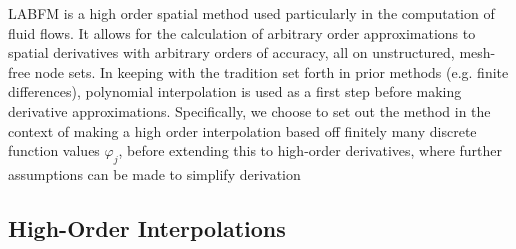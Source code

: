 LABFM \cite{king2024MeshFreeFrameworkHighOrder, king2020HighOrderDifference, king2024MeshFreeFrameworkHighOrdera, king2022HighOrderSimulationsIsothermal, broadley2025HighorderMeshfreeDirect, starepravo2025CanNeuralNetworks} is a high order spatial method used particularly in the computation of fluid flows. It allows for the calculation of arbitrary order approximations to spatial derivatives with arbitrary orders of accuracy, all on unstructured, mesh-free node sets. In keeping with the tradition set forth in prior methods (e.g. finite differences), polynomial interpolation is used as a first step before making derivative approximations. Specifically, we choose to set out the method in the context of making a high order interpolation based off finitely many discrete function values $φ_j$, before extending this to high-order derivatives, where further assumptions can be made to simplify derivation


\subsection{High-Order Interpolations}

